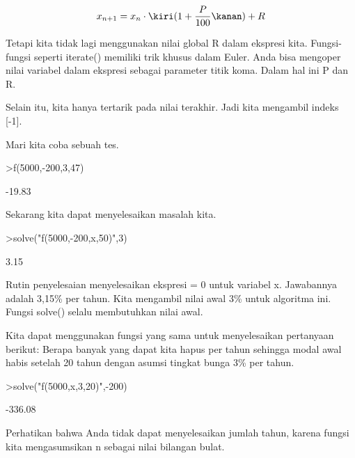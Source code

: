 \documentclass{article}
\begin{document}
\begin{eulernotebook}
\begin{eulercomment}
\begin{eulercomment}
\begin{eulercomment}
\end{eulercomment}
\begin{eulerformula}
\[
x_{n+1} = x_n \cdot \kiri(1+ \frac{P}{100}\kanan) + R
\]
\end{eulerformula}
\begin{eulercomment}
Tetapi kita tidak lagi menggunakan nilai global R dalam ekspresi kita.
Fungsi-fungsi seperti iterate() memiliki trik khusus dalam Euler. Anda
bisa mengoper nilai variabel dalam ekspresi sebagai parameter titik
koma. Dalam hal ini P dan R.


Selain itu, kita hanya tertarik pada nilai terakhir. Jadi kita
mengambil indeks [-1].


Mari kita coba sebuah tes.
\end{eulercomment}
\begin{eulerprompt}
>f(5000,-200,3,47)
\end{eulerprompt}
\begin{euleroutput}
       -19.83 
\end{euleroutput}
\begin{eulercomment}
Sekarang kita dapat menyelesaikan masalah kita.
\end{eulercomment}
\begin{eulerprompt}
>solve("f(5000,-200,x,50)",3)
\end{eulerprompt}
\begin{euleroutput}
         3.15 
\end{euleroutput}
\begin{eulercomment}
Rutin penyelesaian menyelesaikan ekspresi = 0 untuk variabel x.
Jawabannya adalah 3,15\% per tahun. Kita mengambil nilai awal 3\% untuk
algoritma ini. Fungsi solve() selalu membutuhkan nilai awal.


Kita dapat menggunakan fungsi yang sama untuk menyelesaikan pertanyaan
berikut: Berapa banyak yang dapat kita hapus per tahun sehingga modal
awal habis setelah 20 tahun dengan asumsi tingkat bunga 3\% per tahun.
\end{eulercomment}
\begin{eulerprompt}
>solve("f(5000,x,3,20)",-200)
\end{eulerprompt}
\begin{euleroutput}
      -336.08 
\end{euleroutput}
\begin{eulercomment}
Perhatikan bahwa Anda tidak dapat menyelesaikan jumlah tahun, karena
fungsi kita mengasumsikan n sebagai nilai bilangan bulat.


\end{eulercomment}
\end{eulercomment}
\end{eulercomment}
\end{eulernotebook}
\end{document}
